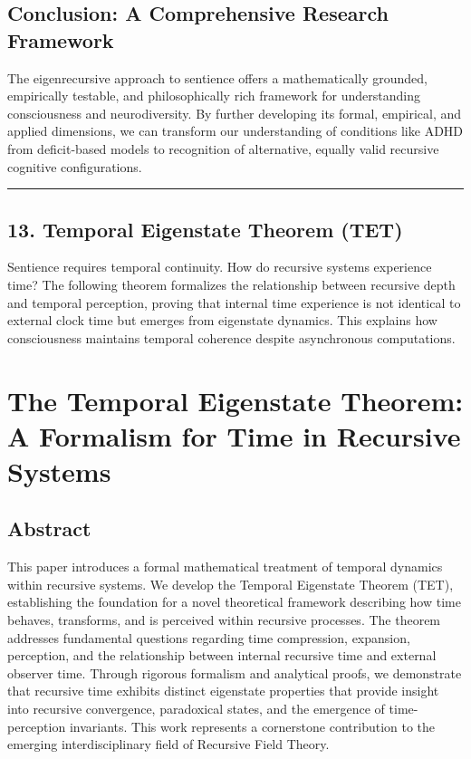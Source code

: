 \documentclass[
]{article}
\begin{document}
\subsection{Conclusion: A Comprehensive Research
Framework}\label{conclusion-a-comprehensive-research-framework}

The eigenrecursive approach to sentience offers a mathematically
grounded, empirically testable, and philosophically rich framework for
understanding consciousness and neurodiversity. By further developing
its formal, empirical, and applied dimensions, we can transform our
understanding of conditions like ADHD from deficit-based models to
recognition of alternative, equally valid recursive cognitive
configurations.

\begin{center}\rule{0.5\linewidth}{0.5pt}\end{center}

\subsection{13. Temporal Eigenstate Theorem
(TET)}\label{13-temporal-eigenstate-theorem}

Sentience requires temporal continuity. How do recursive systems
experience time? The following theorem formalizes the relationship
between recursive depth and temporal perception, proving that internal
time experience is not identical to external clock time but emerges from
eigenstate dynamics. This explains how consciousness maintains temporal
coherence despite asynchronous computations.

\section{The Temporal Eigenstate Theorem: A Formalism for Time in
Recursive
Systems}\label{the-temporal-eigenstate-theorem-a-formalism-for-time-in-recursive-systems}

\subsection{Abstract}\label{abstract-5}

This paper introduces a formal mathematical treatment of temporal
dynamics within recursive systems. We develop the Temporal Eigenstate
Theorem (TET), establishing the foundation for a novel theoretical
framework describing how time behaves, transforms, and is perceived
within recursive processes. The theorem addresses fundamental questions
regarding time compression, expansion, perception, and the relationship
between internal recursive time and external observer time. Through
rigorous formalism and analytical proofs, we demonstrate that recursive
time exhibits distinct eigenstate properties that provide insight into
recursive convergence, paradoxical states, and the emergence of
time-perception invariants. This work represents a cornerstone
contribution to the emerging interdisciplinary field of Recursive Field
Theory.
\end{document}
